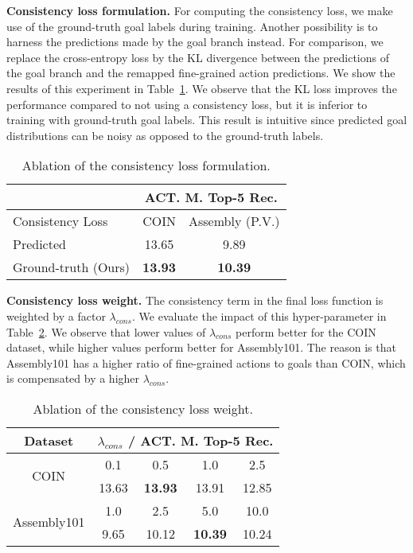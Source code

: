 \documentclass{article}
\begin{document}
\textbf{Consistency loss formulation.} For computing the consistency loss, we make use of the ground-truth goal labels during training. Another possibility is to harness the predictions made by the goal branch instead. For comparison, we replace the cross-entropy loss by the KL divergence between the predictions of the goal branch and the remapped fine-grained action predictions. 
We show the results of this experiment in Table~\ref{tab:abl_formulation}.  We observe that the KL loss improves the performance compared to not using a consistency loss, but it is inferior to training with ground-truth goal labels. This result is intuitive since predicted goal distributions can be noisy as opposed to the ground-truth labels.
\begin{table}[h!]
    \centering
    \scriptsize
    \begin{tabular}{|l|c|c|}
        \hline
        & \multicolumn{2}{c|}{ACT. M. Top-5 Rec.} \\
        \hline
        Consistency Loss & COIN & Assembly (P.V.)  \\
        \hline
        Predicted & 13.65 & 9.89 \\
        Ground-truth (Ours) & \textbf{13.93} &\textbf{10.39} \\
        \hline
    \end{tabular}
    \caption{\small Ablation of the consistency loss formulation.}
    \label{tab:abl_formulation}
\end{table}


\textbf{Consistency loss weight.} The consistency term in the final loss function is weighted by a factor $\lambda_{cons}$. We evaluate the impact of this hyper-parameter in Table~\ref{tab:abl_lambda}. We observe that lower values of $\lambda_{cons}$ perform better for the COIN dataset, while higher values perform better for Assembly101. The reason is that Assembly101 has a higher ratio of fine-grained actions to goals than COIN, which is compensated by a higher $\lambda_{cons}$.        






\begin{table}[h!]
    \centering
    \scriptsize
    \begin{tabular}{|c|c|c|c|c|}
        \hline
        {Dataset}& \multicolumn{4}{c|}{$\lambda_{cons}$ / ACT. M. Top-5 Rec.} \\
        \hline
        \multirow{2}{*}{COIN} & 0.1 & 0.5 & 1.0 & 2.5 \\
        \cline{2-5}
        & 13.63 & \textbf{13.93} & 13.91 & 12.85  \\
        \hline
        \hline
        \multirow{2}{*}{Assembly101} & 1.0 & 2.5 & 5.0 & 10.0 \\
        \cline{2-5}
        & 9.65 & 10.12 & \textbf{10.39} & 10.24 \\
        \hline
    \end{tabular}
    \caption{\small Ablation of the consistency loss weight.}
    \label{tab:abl_lambda}
    \vspace{-0.5cm}
\end{table}
\end{document}
